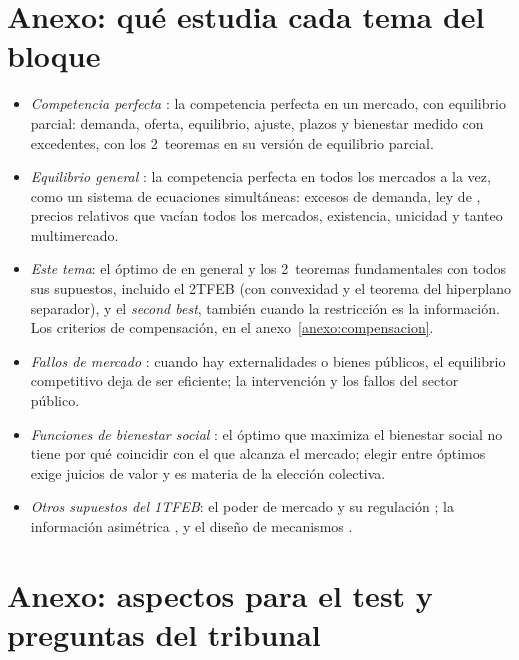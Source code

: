 \documentclass[11pt]{article}
\begin{document}
\section{Anexo: qué estudia cada tema del bloque}\label{anexo:bloque}

\begin{itemize}
\item \emph{Competencia perfecta} : la competencia perfecta en un mercado, con equilibrio parcial: demanda, oferta, equilibrio, ajuste, plazos y bienestar medido con excedentes, con los 2~teoremas en su versión de equilibrio parcial.
\item \emph{Equilibrio general} : la competencia perfecta en todos los mercados a la vez, como un sistema de ecuaciones simultáneas: excesos de demanda, ley de , precios relativos que vacían todos los mercados, existencia, unicidad y tanteo multimercado.
\item \emph{Este tema}: el óptimo de  en general y los 2~teoremas fundamentales con todos sus supuestos, incluido el 2TFEB (con convexidad y el teorema del hiperplano separador), y el \emph{second best}, también cuando la restricción es la información. Los criterios de compensación, en el anexo~\ref{anexo:compensacion}.
\item \emph{Fallos de mercado} : cuando hay externalidades o bienes públicos, el equilibrio competitivo deja de ser eficiente; la intervención y los fallos del sector público.
\item \emph{Funciones de bienestar social} : el óptimo que maximiza el bienestar social no tiene por qué coincidir con el que alcanza el mercado; elegir entre óptimos exige juicios de valor y es materia de la elección colectiva.
\item \emph{Otros supuestos del 1TFEB}: el poder de mercado y su regulación  ; la información asimétrica , y el diseño de mecanismos .
\end{itemize}

\section{Anexo: aspectos para el test y preguntas del tribunal}\label{anexo:test}
\end{document}
